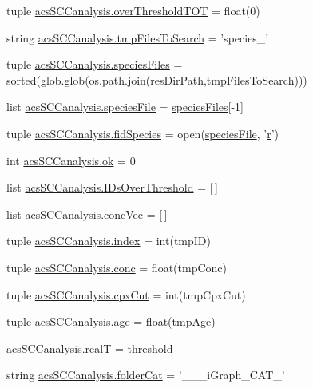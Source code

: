 \begin{DoxyCompactItemize}
\item 
tuple \hyperlink{a00128_a93de20dd9ebf791127ac5aefc0a2df8d}{acs\-S\-C\-Canalysis.\-over\-Threshold\-T\-O\-T} = float(0)
\item 
string \hyperlink{a00128_a141356fc914110fdf3ec4f0fc3beaab5}{acs\-S\-C\-Canalysis.\-tmp\-Files\-To\-Search} = 'species\-\_\-'
\item 
tuple \hyperlink{a00128_a4f47408478e9a0590d016df50cf42141}{acs\-S\-C\-Canalysis.\-species\-Files} = sorted(glob.\-glob(os.\-path.\-join(res\-Dir\-Path,tmp\-Files\-To\-Search)))
\item 
list \hyperlink{a00128_a1d066fa24dced2da12ffd9a8514a17ba}{acs\-S\-C\-Canalysis.\-species\-File} = \hyperlink{a00028_af5703745c2c2a6af7f62da460994d9c2}{species\-Files}\mbox{[}-\/1\mbox{]}
\item 
tuple \hyperlink{a00128_aba2f982879776e057b35971b3653549e}{acs\-S\-C\-Canalysis.\-fid\-Species} = open(\hyperlink{a00027_a7da0c82834970c5f3c3d9224ab832577}{species\-File}, '\hyperlink{a00031_ac862e7284527eb913b1351c8bfb8e079}{r}')
\item 
int \hyperlink{a00128_a9ce833d782f17d858941cfa76914599a}{acs\-S\-C\-Canalysis.\-ok} = 0
\item 
list \hyperlink{a00128_a578f0f0f1e87579d73b11f8720610b1e}{acs\-S\-C\-Canalysis.\-I\-Ds\-Over\-Threshold} = \mbox{[}$\,$\mbox{]}
\item 
list \hyperlink{a00128_a1681853ab5f5859e51f219caa07a8539}{acs\-S\-C\-Canalysis.\-conc\-Vec} = \mbox{[}$\,$\mbox{]}
\item 
tuple \hyperlink{a00128_aaac3bb67a998c4a09aeed8f1adec2f9c}{acs\-S\-C\-Canalysis.\-index} = int(tmp\-I\-D)
\item 
tuple \hyperlink{a00128_a6ec435b19c74f79f32a0eae7bb2bd1c8}{acs\-S\-C\-Canalysis.\-conc} = float(tmp\-Conc)
\item 
tuple \hyperlink{a00128_a06673ec4592e44a89a443073b8a29011}{acs\-S\-C\-Canalysis.\-cpx\-Cut} = int(tmp\-Cpx\-Cut)
\item 
tuple \hyperlink{a00128_a98baad82b74a27e8b8c58aa985b7d374}{acs\-S\-C\-Canalysis.\-age} = float(tmp\-Age)
\item 
\hyperlink{a00128_a1c9b45f6074222ace96b7ab38cb8e23b}{acs\-S\-C\-Canalysis.\-real\-T} = \hyperlink{a00036_aa022cbb28f80299d572def08e7a5ccfd}{threshold}
\item 
string \hyperlink{a00128_a1cbfd083273176eebfe0260e8384acef}{acs\-S\-C\-Canalysis.\-folder\-Cat} = '\-\_\-\-\_\-\_\-i\-Graph\-\_\-\-C\-A\-T\-\_\-'
\item 

\end{DoxyCompactItemize}
